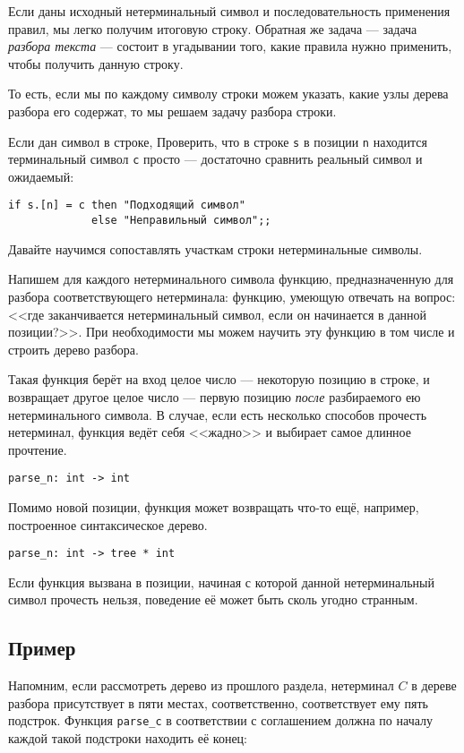 \documentclass[12pt]{article}
\begin{document}
Если даны исходный нетерминальный символ и последовательность применения
правил, мы легко получим итоговую строку. 
Обратная же задача --- задача \emph{разбора текста} --- состоит
в угадывании того, какие правила нужно применить, чтобы получить данную
строку. 

То есть, если мы по каждому символу строки можем указать, какие узлы
дерева разбора его содержат, то мы решаем задачу разбора строки.

Если дан символ в строке, 
Проверить, что в строке \verb!s! в позиции \verb!n! находится терминальный символ
\verb!c! просто --- достаточно сравнить реальный символ и ожидаемый:
\begin{verbatim}
if s.[n] = c then "Подходящий символ" 
             else "Неправильный символ";;
\end{verbatim}
Давайте научимся сопоставлять участкам строки нетерминальные символы. 

Напишем для каждого нетерминального символа функцию, предназначенную
для разбора соответствующего нетерминала: функцию, умеющую отвечать на
вопрос: <<где заканчивается нетерминальный символ, если он начинается
в данной позиции?>>. При необходимости мы можем научить эту функцию
в том числе и строить дерево разбора.

Такая функция берёт на вход целое число --- некоторую позицию в строке, 
и возвращает другое целое число --- первую позицию \emph{после} 
разбираемого ею нетерминального символа. В случае, если есть несколько 
способов прочесть нетерминал, функция ведёт себя <<жадно>> и выбирает 
самое длинное прочтение.

\begin{verbatim}
parse_n: int -> int
\end{verbatim}

Помимо новой позиции, функция может возвращать что-то ещё, например,
построенное синтаксическое дерево.

\begin{verbatim}
parse_n: int -> tree * int
\end{verbatim}

Если функция вызвана в позиции, начиная с которой данной нетерминальный
символ прочесть нельзя, поведение её может быть сколь угодно странным.

\subsection{Пример}

Напомним, если рассмотреть дерево из прошлого раздела, нетерминал $C$ 
в дереве разбора присутствует в пяти местах, соответственно, соответствует
ему пять подстрок. Функция \verb!parse_c! в соответствии с соглашением
должна по началу каждой такой подстроки находить её конец:
\end{document}

